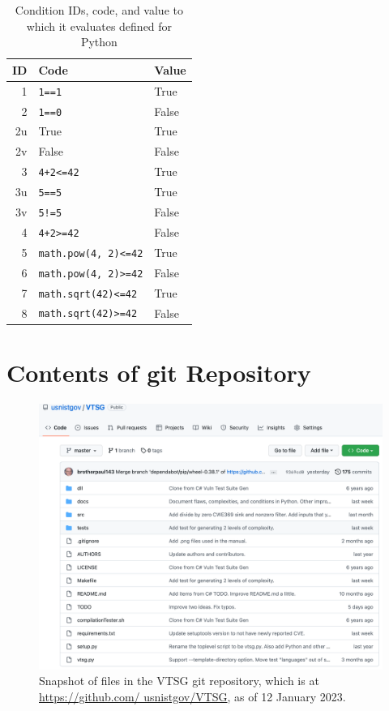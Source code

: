 \documentclass[12pt]{article}
\begin{document}
\begin{table}[H]
\centering
\caption{Condition IDs, code, and value to which it evaluates defined for
  Python}
\begin{tabular}{|r|l|l|}
\hline
\textbf{ID} & \textbf{Code} & \textbf{Value} \\
\hline
1 & \verb|1==1| & True \\
\hline
2 & \verb|1==0| & False \\
\hline
2u & True & True \\
\hline
2v & False & False \\
\hline
3 & \verb|4+2<=42| & True \\
\hline
3u & \verb|5==5| & True \\
\hline
3v & \verb|5!=5| & False \\
\hline
4 & \verb|4+2>=42| & False \\
\hline
5 & \verb|math.pow(4, 2)<=42| & True \\
\hline
6 & \verb|math.pow(4, 2)>=42| & False \\
\hline
7 & \verb|math.sqrt(42)<=42| & True \\
\hline
8 & \verb|math.sqrt(42)>=42| & False \\
\hline
\end{tabular}
\label{tab:condition IDs for Python}
\end{table}


\clearpage

\section{Contents of git Repository}
\label{gitContent}

\begin{figure}[htbp]
  \includegraphics[width=1\linewidth]{fig_git_files.png}
  \caption{Snapshot of files in the VTSG git repository, which is at
    \href{https://github.com/usnistgov/VTSG}{https://github.com/ usnistgov/VTSG},
    as of 12 January 2023.}
  \label{fig:git files}
\end{figure}
\end{document}
